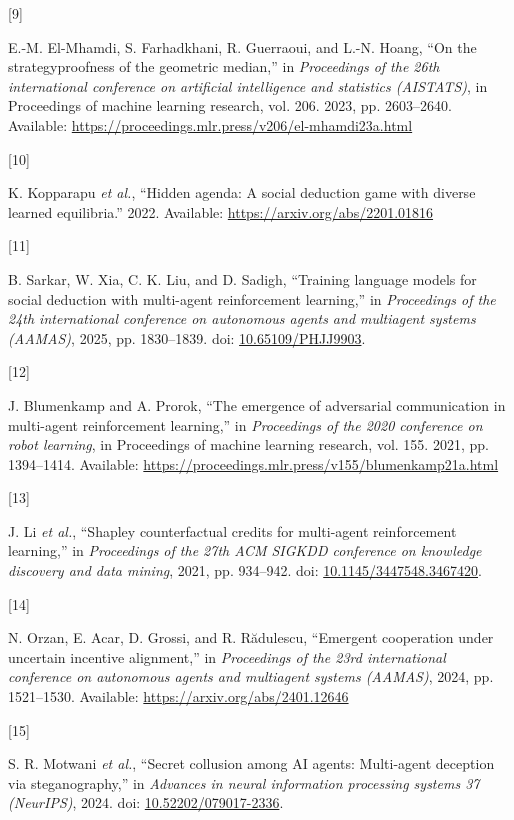 \documentclass[
  12pt,
]{article}
\newlength{\cslhangindent}
\newlength{\csllabelwidth}
\newenvironment{CSLReferences}[2] %
 {\begin{list}{}{%
  \setlength{\itemindent}{0pt}
  \setlength{\leftmargin}{0pt}
  \setlength{\parsep}{0pt}
  \ifodd #1
   \setlength{\leftmargin}{\cslhangindent}
   \setlength{\itemindent}{-1\cslhangindent}
  \fi
  \setlength{\itemsep}{#2\baselineskip}}}
 {\end{list}}
\newcommand{\CSLLeftMargin}[1]{\parbox[t]{\csllabelwidth}{\strut#1\strut}}
\newcommand{\CSLRightInline}[1]{\parbox[t]{\linewidth - \csllabelwidth}{\strut#1\strut}}
\begin{document}
\begin{CSLReferences}{0}{0}
\CSLLeftMargin{{[}9{]} }%
\CSLRightInline{E.-M. El-Mhamdi, S. Farhadkhani, R. Guerraoui, and L.-N.
Hoang, {``On the strategyproofness of the geometric median,''} in
\emph{Proceedings of the 26th international conference on artificial
intelligence and statistics (AISTATS)}, in Proceedings of machine
learning research, vol. 206. 2023, pp. 2603--2640. Available:
\url{https://proceedings.mlr.press/v206/el-mhamdi23a.html}}

\CSLLeftMargin{{[}10{]} }%
\CSLRightInline{K. Kopparapu \emph{et al.}, {``Hidden agenda: A social
deduction game with diverse learned equilibria.''} 2022. Available:
\url{https://arxiv.org/abs/2201.01816}}

\CSLLeftMargin{{[}11{]} }%
\CSLRightInline{B. Sarkar, W. Xia, C. K. Liu, and D. Sadigh, {``Training
language models for social deduction with multi-agent reinforcement
learning,''} in \emph{Proceedings of the 24th international conference
on autonomous agents and multiagent systems (AAMAS)}, 2025, pp.
1830--1839. doi:
\href{https://doi.org/10.65109/PHJJ9903}{10.65109/PHJJ9903}.}

\CSLLeftMargin{{[}12{]} }%
\CSLRightInline{J. Blumenkamp and A. Prorok, {``The emergence of
adversarial communication in multi-agent reinforcement learning,''} in
\emph{Proceedings of the 2020 conference on robot learning}, in
Proceedings of machine learning research, vol. 155. 2021, pp.
1394--1414. Available:
\url{https://proceedings.mlr.press/v155/blumenkamp21a.html}}

\CSLLeftMargin{{[}13{]} }%
\CSLRightInline{J. Li \emph{et al.}, {``Shapley counterfactual credits
for multi-agent reinforcement learning,''} in \emph{Proceedings of the
27th ACM SIGKDD conference on knowledge discovery and data mining},
2021, pp. 934--942. doi:
\href{https://doi.org/10.1145/3447548.3467420}{10.1145/3447548.3467420}.}

\CSLLeftMargin{{[}14{]} }%
\CSLRightInline{N. Orzan, E. Acar, D. Grossi, and R. Rădulescu,
{``Emergent cooperation under uncertain incentive alignment,''} in
\emph{Proceedings of the 23rd international conference on autonomous
agents and multiagent systems (AAMAS)}, 2024, pp. 1521--1530. Available:
\url{https://arxiv.org/abs/2401.12646}}

\CSLLeftMargin{{[}15{]} }%
\CSLRightInline{S. R. Motwani \emph{et al.}, {``Secret collusion among
{AI} agents: Multi-agent deception via steganography,''} in
\emph{Advances in neural information processing systems 37 (NeurIPS)},
2024. doi:
\href{https://doi.org/10.52202/079017-2336}{10.52202/079017-2336}.}


\end{CSLReferences}
\end{document}
